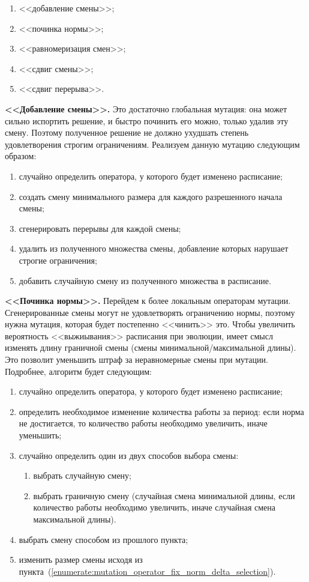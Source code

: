 \documentclass[times,specification,annotation]{itmo-student-thesis}
\begin{document}
\begin{enumerate}
    \item <<добавление смены>>;
    \item <<починка нормы>>;
    \item <<равномеризация смен>>;
    \item <<сдвиг смены>>;
    \item <<сдвиг перерыва>>.
\end{enumerate}

\textbf{<<Добавление смены>>.}
Это достаточно глобальная мутация: она может сильно испортить решение, и быстро починить его можно, только удалив эту смену.
Поэтому полученное решение не должно ухудшать степень удовлетворения строгим ограничениям.
Реализуем данную мутацию следующим образом:

\begin{enumerate}
    \item случайно определить оператора, у которого будет изменено расписание;
    \item создать смену минимального размера для каждого разрешенного начала смены;
    \item сгенерировать перерывы для каждой смены;
    \item удалить из полученного множества смены, добавление которых нарушает строгие ограничения;
    \item добавить случайную смену из полученного множества в расписание.
\end{enumerate}

\textbf{<<Починка нормы>>.}
Перейдем к более локальным операторам мутации.
Сгенерированные смены могут не удовлетворять ограничению нормы, поэтому нужна мутация, которая будет постепенно <<чинить>> это.
Чтобы увеличить вероятность <<выжиывания>> расписания при эволюции, имеет смысл изменять длину граничной смены (смены минимальной/максимальной длины).
Это позволит уменьшить штраф за неравномерные смены при мутации.
Подробнее, алгоритм будет следующим:

\begin{enumerate}
    \item случайно определить оператора, у которого будет изменено расписание;
    \item \label{enumerate:mutation_operator_fix_norm_delta_selection} определить необходимое изменение количества работы за период: если норма не достигается, то количество работы необходимо увеличить, иначе уменьшить;
    \item случайно определить один из двух способов выбора смены:
    \begin{enumerate}
        \item выбрать случайную смену;
        \item выбрать граничную смену (случайная смена минимальной длины, если количество работы необходимо увеличить, иначе случайная смена максимальной длины).
    \end{enumerate}
    \item выбрать смену способом из прошлого пункта;
    \item изменить размер смены исходя из пункта~(\ref{enumerate:mutation_operator_fix_norm_delta_selection}).
\end{enumerate}
\end{document}
